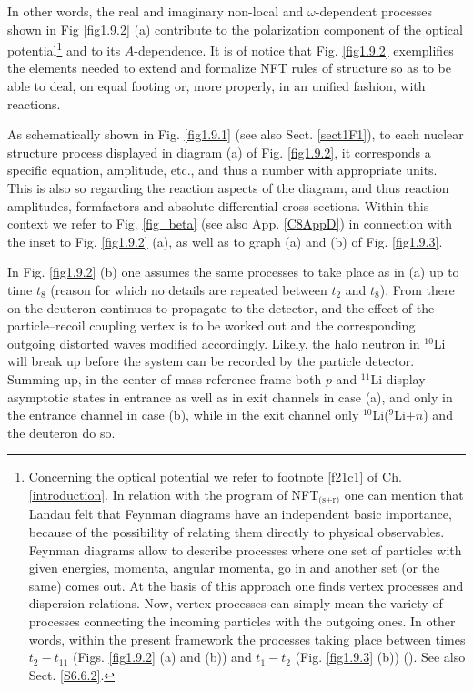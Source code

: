 In other words, the real and imaginary non-local and $\omega$-dependent processes  shown in Fig \ref{fig1.9.2} (a) contribute to the  polarization component of the optical potential\footnote{Concerning the optical potential we refer to footnote \ref{f21c1} of Ch. \ref{introduction}. In relation with the program of NFT$_{\text{(s+r)}}$ one can mention that Landau felt that  Feynman diagrams have an independent basic importance, because of the possibility of relating them directly to physical observables. Feynman diagrams allow to describe processes where one set of particles with given energies, momenta, angular momenta, go in and another set (or the same) comes out. At the basis of this approach one finds vertex processes and dispersion relations. Now, vertex processes can simply mean the variety of processes connecting the incoming particles with the outgoing ones. In other words, within the present framework the processes taking place between times $t_2-t_{11}$ (Figs. \ref{fig1.9.2} (a) and (b)) and $t_1-t_2$ (Fig. \ref{fig1.9.3} (b)) (\cite{Landau:59,terHaar:69}). See also Sect. \ref{S6.6.2}.} and to its $A$-dependence. 
  It is of
notice that Fig. \ref{fig1.9.2} exemplifies  the elements needed to extend and formalize NFT rules of
structure so as to be able to deal, on equal footing or, more properly, in an unified fashion,  with reactions.

As schematically shown in Fig. \ref{fig1.9.1} (see also Sect. \ref{sect1F1}), to each nuclear structure process displayed in diagram (a) of Fig. \ref{fig1.9.2}, it corresponds a specific equation, amplitude, etc., and thus a number with appropriate units. This is also so regarding the reaction aspects of the diagram, and thus reaction amplitudes, formfactors and  absolute differential cross sections.
Within this context we refer to Fig. \ref{fig_beta} (see also App. \ref{C8AppD}) in connection with the inset to Fig. \ref{fig1.9.2} (a), as well as to graph (a) and (b) of Fig. \ref{fig1.9.3}.


 In Fig. \ref{fig1.9.2} (b) one assumes the same processes to take place  as in (a) up to time $t_8$ (reason for which no details
are repeated between $t_2$ and $t_8$). From there on the deuteron continues to propagate to
the detector, and the effect of the particle--recoil coupling vertex is to be worked out and the corresponding outgoing distorted waves modified accordingly. Likely, the halo neutron in $^{10}$Li will break up
before the system can be recorded by the particle detector. Summing up, in the center of mass reference frame both $p$ and $^{11}$Li
display asymptotic states in entrance as well as in exit channels in case (a), and only
in the entrance channel in case (b), while in the exit channel only $^{10}$Li($^9$Li+$n$) and the
deuteron do so. 

